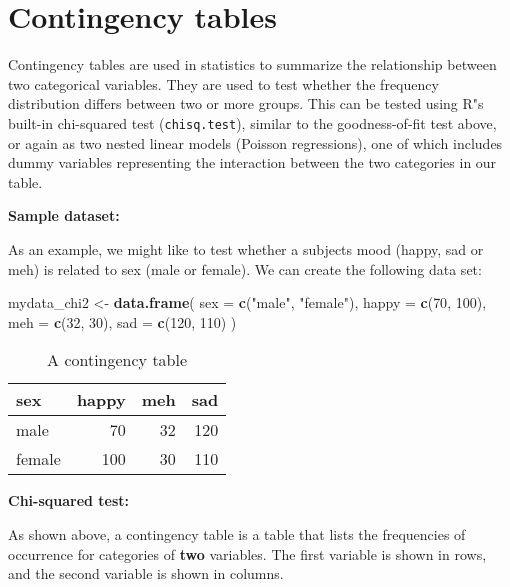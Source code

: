 \documentclass[
  12pt,
]{krantz}
\newenvironment{Shaded}{\begin{snugshade}}{\end{snugshade}}
\newcommand{\DataTypeTok}[1]{\textcolor[rgb]{0.13,0.29,0.53}{#1}}
\newcommand{\DecValTok}[1]{\textcolor[rgb]{0.00,0.00,0.81}{#1}}
\newcommand{\KeywordTok}[1]{\textcolor[rgb]{0.13,0.29,0.53}{\textbf{#1}}}
\newcommand{\NormalTok}[1]{#1}
\newcommand{\StringTok}[1]{\textcolor[rgb]{0.31,0.60,0.02}{#1}}
\begin{document}
\hypertarget{contingency-tables}{%
\section{Contingency tables}\label{contingency-tables}}

Contingency tables are used in statistics to summarize the relationship between two categorical variables. They are used to test whether the frequency distribution differs between two or more groups. This can be tested using R"s built-in chi-squared test (\texttt{chisq.test}), similar to the goodness-of-fit test above, or again as two nested linear models (Poisson regressions), one of which includes dummy variables representing the interaction between the two categories in our table.

\textbf{Sample dataset:}

As an example, we might like to test whether a subjects mood (happy, sad or meh) is related to sex (male or female). We can create the following data set:

\begin{Shaded}
\begin{Highlighting}[]
\NormalTok{mydata\_chi2 \textless{}{-}}\StringTok{ }\KeywordTok{data.frame}\NormalTok{(}
  \DataTypeTok{sex =} \KeywordTok{c}\NormalTok{(}\StringTok{"male"}\NormalTok{, }\StringTok{"female"}\NormalTok{),}
  \DataTypeTok{happy =} \KeywordTok{c}\NormalTok{(}\DecValTok{70}\NormalTok{, }\DecValTok{100}\NormalTok{),}
  \DataTypeTok{meh =} \KeywordTok{c}\NormalTok{(}\DecValTok{32}\NormalTok{, }\DecValTok{30}\NormalTok{),}
  \DataTypeTok{sad =} \KeywordTok{c}\NormalTok{(}\DecValTok{120}\NormalTok{, }\DecValTok{110}\NormalTok{)}
\NormalTok{)}
\end{Highlighting}
\end{Shaded}

\begin{table}

\caption{\label{tab:unnamed-chunk-61}A contingency table}
\centering
\begin{tabular}[t]{lrrr}
\toprule
sex & happy & meh & sad\\
\midrule
male & 70 & 32 & 120\\
female & 100 & 30 & 110\\
\bottomrule
\end{tabular}
\end{table}

\textbf{Chi-squared test:}

As shown above, a contingency table is a table that lists the frequencies of occurrence for categories of \textbf{two} variables. The first variable is shown in rows, and the second variable is shown in columns.
\end{document}
